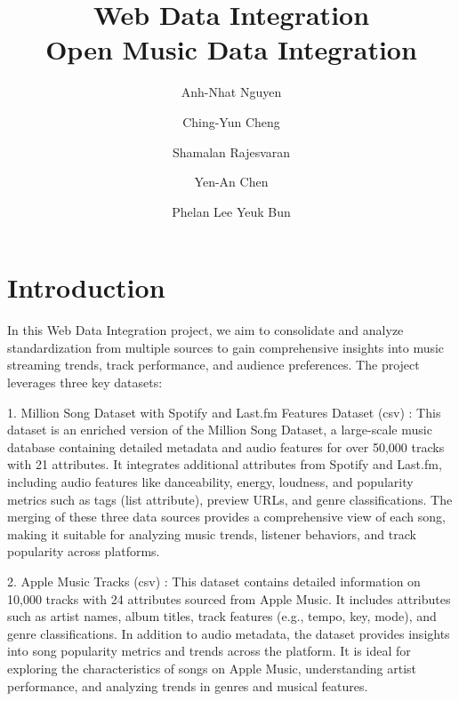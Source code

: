 \documentclass[runningheads]{llncs}
\begin{document}
	\pagestyle{plain} %
	
	\title{Web Data Integration\\Open Music Data Integration}
	\author{Anh-Nhat Nguyen \and
		Ching-Yun Cheng\and
		Shamalan Rajesvaran \and 
		Yen-An Chen \and 
		Phelan Lee Yeuk Bun }
%
\maketitle              %
%
\section{Introduction}
In this Web Data Integration project, we aim to consolidate and analyze standardization from multiple sources to gain comprehensive insights into music streaming trends, track performance, and audience preferences. The project leverages three key datasets:

1. Million Song Dataset with Spotify and Last.fm Features Dataset (csv) \cite{Million_Spot_LastFM}: This dataset is an enriched version of the Million Song Dataset, a large-scale music database containing detailed metadata and audio features for over 50,000 tracks with 21 attributes. It integrates additional attributes from Spotify and Last.fm, including audio features like danceability, energy, loudness, and popularity metrics such as tags (list attribute), preview URLs, and genre classifications. The merging of these three data sources provides a comprehensive view of each song, making it suitable for analyzing music trends, listener behaviors, and track popularity across platforms.

2. Apple Music Tracks (csv) \cite{Apple_Music}: This dataset contains detailed information on 10,000 tracks with 24 attributes sourced from Apple Music. It includes attributes such as artist names, album titles, track features (e.g., tempo, key, mode), and genre classifications. In addition to audio metadata, the dataset provides insights into song popularity metrics and trends across the platform. It is ideal for exploring the characteristics of songs on Apple Music, understanding artist performance, and analyzing trends in genres and musical features.
\end{document}
